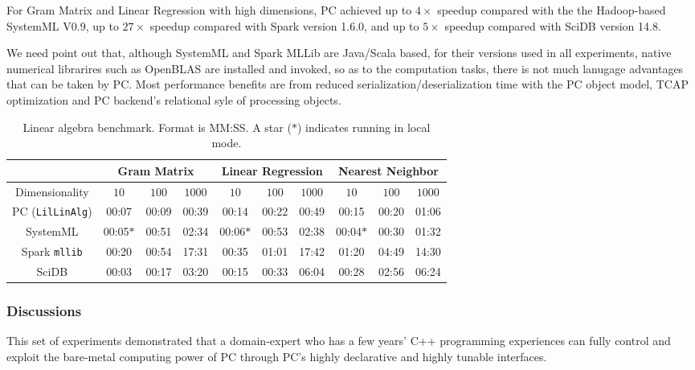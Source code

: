 For Gram Matrix and Linear Regression with high dimensions, PC achieved up to
$4\times$ speedup compared with the the Hadoop-based SystemML V0.9, up to $27\times$
speedup compared with Spark version 1.6.0, and up to $5\times$ speedup compared
with SciDB version 14.8.

We need point out that, although SystemML and Spark MLLib are
Java/Scala based, for their versions used
in all experiments, native
numerical librarires such as OpenBLAS are installed and invoked, so as to
the computation tasks, there is not much lanugage advantages that can
be taken by PC. Most performance benefits are from reduced
serialization/deserialization time with the PC object model, TCAP optimization and PC
backend's relational syle of processing objects.


\begin{table}[h!]
\begin{center}
\begin{tabular}{|c||c|c|c||c|c|c||c|c|c||}
\hline
& \multicolumn{3}{c||}{Gram Matrix} & \multicolumn{3}{c||}{Linear Regression} & \multicolumn{3}{c||}{Nearest Neighbor} \\
\hline
Dimensionality & $10$ & $100$ & $1000$& $10$ & $100$ & $1000$& $10$ & $100$ & $1000$ \\
\hline
\hline
PC (\texttt{LilLinAlg}) &00:07 & 00:09 &00:39 &00:14 &00:22 &00:49& 00:15 & 00:20 & 01:06 \\
SystemML &00:05$*$ &00:51 &02:34 &00:06$*$ &00:53 &02:38 &00:04$*$ &00:30 &01:32 \\
Spark \texttt{mllib} &00:20  &00:54 &17:31 &00:35 &01:01 &17:42 &01:20 & 04:49 &14:30 \\
SciDB   &00:03 &00:17 &03:20 &00:15 &00:33 &06:04 &00:28 &02:56 & 06:24 \\
\hline
\end{tabular}
\caption{Linear algebra benchmark. Format is MM:SS.
A star ($*$) indicates running in local mode.}
\label{fig:LR}
\end{center}
\end{table}

\subsubsection {Discussions}
This set of experiments demonstrated that a
domain-expert who has a few years' C++ programming experiences can fully control and
exploit the bare-metal computing power of PC through PC's highly
declarative and highly tunable interfaces.

